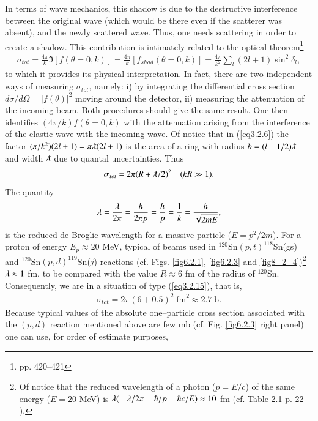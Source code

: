 In terms of wave mechanics, this shadow is due to the destructive interference between the original wave (which would be there even if the scatterer was absent), and the newly scattered wave. Thus, one needs scattering in order to create a shadow. This contribution is intimately related to the optical theorem\footnote{\cite{Sakurai:94} pp. 420--421}
\begin{align}\label{eq3.2.9}
\sigma_{tot}=\frac{4\pi}{k}\Im[f(\theta=0,k)]=\frac{4\pi}{k}[f_{shad}(\theta=0,k)]=\frac{4\pi}{k^2}\sum_l(2l+1)\sin^2\delta_l,
\end{align}
to which it provides its physical interpretation. In fact,  there are two independent ways of measuring $\sigma_{tot}$, namely: i) by integrating the differential cross section $d\sigma/d\Omega=|f(\theta)|^2$ moving around the detector, ii) measuring the attenuation of the incoming beam. Both procedures should give the same result. One then identifies $(4\pi/k)f(\theta=0,k)$ with the attenuation arising from the interference of the elastic wave with the incoming wave. Of notice that in (\ref{eq3.2.6}) the factor $(\pi/k^2)(2l+1)=\pi\lambdabar(2l+1)$ is the area of a ring  with radius $b=(l+1/2)\lambdabar$ and width $\lambdabar$ due to quantal uncertainties. Thus
\begin{align}\label{eq3.2.15}
\sigma_{tot}=2\pi(R+\lambdabar/2)^2\quad(kR\gg1).
\end{align}
The quantity
\begin{align}
\lambdabar=\frac{\lambda}{2\pi}=\frac{h}{2\pi p}=\frac{\hbar}{p}=\frac{1}{k}=\frac{\hbar}{\sqrt{2mE}},
\end{align}
is the reduced de Broglie wavelength for a massive particle ($E=p^2/2m$). For a proton of energy $E_p\approx 20$ MeV, typical of beams used in $^{120}$Sn$(p,t)^{118}$Sn(gs) and $^{120}$Sn$(p,d)^{119}$Sn($j$) reactions (cf. Figs. \ref{fig6.2.1}, \ref{fig6.2.3} and \ref{fig8_2_4})\footnote{Of notice that the reduced wavelength of a photon ($p=E/c$) of the same energy ($E= 20$ MeV) is $\lambdabar (=\lambda/2\pi=\hbar/p=\hbar c/E)\approx 10$ fm (cf. Table 2.1 p. 22 \cite{Satchler:80}).} $\lambdabar\approx 1$ fm, to be compared with the value $R\approx 6$ fm of the radius of $^{120}$Sn. Consequently, we are in a situation of type (\ref{eq3.2.15}), that is,
\begin{align}
\sigma_{tot}=2\pi(6+0.5)^2\;\text{fm}^2\approx 2.7\;\text{b}.
\end{align}
Because typical values of the absolute one--particle cross section associated  with the $(p,d)$ reaction mentioned above are few mb (cf. Fig. \ref{fig6.2.3} right panel) one can use, for order of estimate purposes,  
